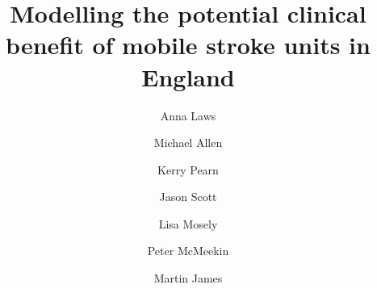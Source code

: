 \title{Modelling the potential clinical benefit of mobile stroke units in England}


\renewcommand{\thefootnote}{\fnsymbol{footnote}}
\author[1,2]{Anna Laws}
\author[*1,2]{Michael Allen}
\author[1,2]{Kerry Pearn}
\author[3]{Jason Scott}
\author[3]{Lisa Mosely}
\author[3]{Peter McMeekin}
\author[1,2]{Martin James}

